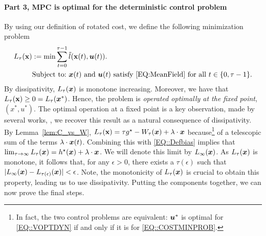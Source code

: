 \paragraph{Part 3, MPC is optimal for the deterministic control problem} By using our definition of rotated cost, we define the following minimization problem
\begin{align}
    L_{\tau}(\textbf{x}) &:= \min\sum_{t = 0}^{\tau - 1}\Tilde{l}(\textbf{x}(t), \bm{u}(t)).\nonumber\\
    &\text{Subject to:} \text{ ${\bm{x}}(t)$  and $\bm{u}(t)$ satisfy \eqref{EQ:MeanField} for all $t\in\{0,\tau-1\}$.}
    \label{EQ::COSTMINPROB}
\end{align}
By dissipativity, $L_\tau({\bm{x}})$ is monotone increasing. Moreover, we have that $L_{\tau}(\textbf{x}) \geq 0 = L_{\tau}({\bm{x}}^*)$. Hence, the problem is \emph{operated optimally at the fixed point}, $(x^*, u^*)$. The optimal operation at a fixed point is a key observation, made by several works, \citep{Avrachenkov2024, GGY23b, yan2024, HXCW23}, we recover this result as a natural consequence of dissipativity.
By Lemma~\ref{lem:C_vs_W},
$L_{\tau}(\textbf{x})= \tau g^{\star} - W_{\tau}{({\bm{x}})} + \lambda \cdot {\bm{x}}$ because\footnote{In fact, the two control problems are equivalent: $\bm{u}^*$ is optimal for \eqref{EQ::VOPTDYN} if and only if it is for \eqref{EQ::COSTMINPROB}. } of a telescopic sum of the terms $\lambda \cdot {\bm{x}}(t)$.  Combining this with \eqref{EQ::Defbias} implies that $\lim_{\tau\to\infty}L_{\tau}({\bm{x}}) = h^{\star}({\bm{x}}) + \lambda \cdot {\bm{x}} $. We will denote this limit by $L_{\infty}({\bm{x}})$. %
As $L_\tau({\bm{x}})$ is monotone, it follows that, for any $\epsilon > 0$, there exists a $\tau(\epsilon)$ such that %
$|L_{\infty}({\bm{x}}) - L_{\tau(\epsilon)}({\bm{x}})| < \epsilon$. Note, the monotonicity of $L_\tau({\bm{x}})$ is crucial to obtain this property, leading us to use dissipativity. Putting the components together, we can now prove the final steps.

